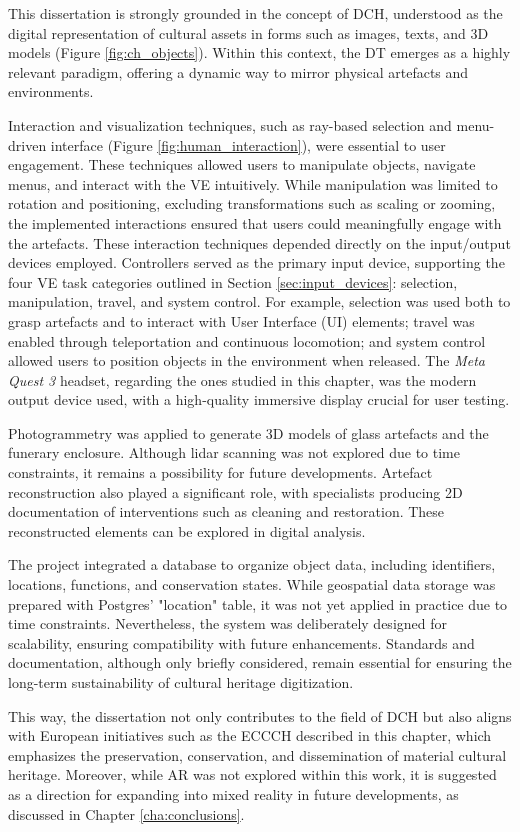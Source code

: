 This dissertation is strongly grounded in the concept of \gls{DCH}, understood as the digital representation of cultural assets in forms such as images, texts, and \gls{3D} models (Figure \ref{fig:ch_objects}). 
Within this context, the \gls{DT} emerges as a highly relevant paradigm, offering a dynamic way to mirror physical artefacts and environments. 

Interaction and visualization techniques, such as ray-based selection and menu-driven interface (Figure \ref{fig:human_interaction}), were essential to user engagement. These techniques allowed users to manipulate objects, navigate menus, and interact with the \gls{VE} intuitively. While manipulation was limited to rotation and positioning, excluding transformations such as scaling or zooming, the implemented interactions ensured that users could meaningfully engage with the artefacts.
These interaction techniques depended directly on the input/output devices employed. Controllers served as the primary input device, supporting the four \gls{VE} task categories outlined in Section \ref{sec:input_devices}: selection, manipulation, travel, and system control. For example, selection was used both to grasp artefacts and to interact with User Interface (\gls{UI}) elements; travel was enabled through teleportation and continuous locomotion; and system control allowed users to position objects in the environment when released. 
The \emph{Meta Quest 3} headset, regarding the ones studied in this chapter, was the modern output device used, with a high-quality immersive display crucial for user testing.

Photogrammetry was applied to generate \gls{3D} models of glass artefacts and the funerary enclosure. Although \gls{lidar} scanning was not explored due to time constraints, it remains a possibility for future developments. Artefact reconstruction also played a significant role, with specialists producing \gls{2D} documentation of interventions such as cleaning and restoration. These reconstructed elements can be explored in digital analysis.

The project integrated a database to organize object data, including identifiers, locations, functions, and conservation states. While geospatial data storage was prepared with Postgres' "location" table, it was not yet applied in practice due to time constraints. Nevertheless, the system was deliberately designed for scalability, ensuring compatibility with future enhancements. Standards and documentation, although only briefly considered, remain essential for ensuring the long-term sustainability of cultural heritage digitization.

This way, the dissertation not only contributes to the field of \gls{DCH} but also aligns with European initiatives such as the \gls{ECCCH} described in this chapter, which emphasizes the preservation, conservation, and dissemination of material cultural heritage. 
Moreover, while \gls{AR} was not explored within this work, it is suggested as a direction for expanding into mixed reality in future developments, as discussed in Chapter \ref{cha:conclusions}.


